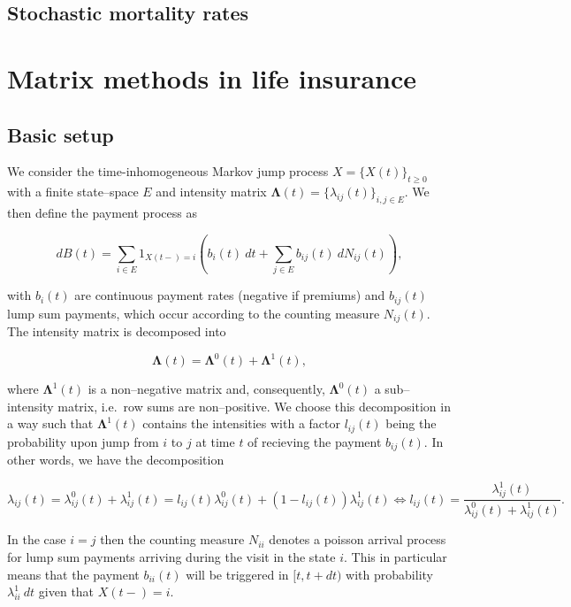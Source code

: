 \documentclass[a4paper,12pt,openany]{book}
\begin{document}
\hypertarget{stochastic-mortality-rates}{%
\subsection{Stochastic mortality rates}\label{stochastic-mortality-rates}}

\hypertarget{matrix-methods-in-life-insurance}{%
\section{Matrix methods in life insurance}\label{matrix-methods-in-life-insurance}}

\hypertarget{basic-setup}{%
\subsection{Basic setup}\label{basic-setup}}

We consider the time-inhomogeneous Markov jump process \(X=\{X(t)\}_{t\ge 0}\) with a finite state--space \(E\) and intensity matrix \(\mathbf \Lambda(t)=\{\lambda_{ij}(t)\}_{i,j\in E}\). We then define the payment process as

\[
dB(t)=\sum_{i\in E}1_{X(t-)=i}\left(b_i(t)\ dt +\sum_{j\in E}b_{ij}(t)\ dN_{ij}(t)\right),
\]

with \(b_i(t)\) are continuous payment rates (negative if premiums) and \(b_{ij}(t)\) lump sum payments, which occur according to the counting measure \(N_{ij}(t)\). The intensity matrix is decomposed into

\[
\mathbf \Lambda(t)=\mathbf \Lambda^0(t) + \mathbf \Lambda^1(t),
\]

where \(\mathbf \Lambda^1(t)\) is a non--negative matrix and, consequently, \(\mathbf \Lambda^0(t)\) a sub--intensity matrix, i.e.~row sums are non--positive. We choose this decomposition in a way such that \(\mathbf \Lambda^1(t)\) contains the intensities with a factor \(l_{ij}(t)\) being the probability upon jump from \(i\) to \(j\) at time \(t\) of recieving the payment \(b_{ij}(t)\). In other words, we have the decomposition

\[
\lambda_{ij}(t)=\lambda_{ij}^0(t)+\lambda_{ij}^1(t)=l_{ij}(t)\lambda_{ij}^0(t)+(1-l_{ij}(t))\lambda_{ij}^1(t)\iff l_{ij}(t)=\frac{\lambda_{ij}^1(t)}{\lambda_{ij}^0(t)+\lambda_{ij}^1(t)}.
\]

In the case \(i=j\) then the counting measure \(N_{ii}\) denotes a poisson arrival process for lump sum payments arriving during the visit in the state \(i\). This in particular means that the payment \(b_{ii}(t)\) will be triggered in \([t,t+dt)\) with probability \(\lambda_{ii}^1\ dt\) given that \(X(t-)=i\).
\end{document}
